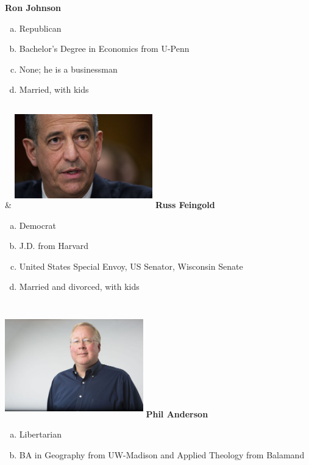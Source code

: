 \documentclass[twoside]{article}
\begin{document}
\begin{center}
\begin{tabu}
              \vskip0.5cm
              {\bfseries\Large Ron Johnson}
              \begin{enumerate}[a)]
                \item Republican
                \item Bachelor's Degree in Economics from U-Penn
                \item None; he is a businessman
                \item Married, with kids
              \end{enumerate}
              &
              \includegraphics[width=6cm,height=4.5cm,keepaspectratio]{images/profiles/feingold.jpeg}
              \vskip0.5cm
              {\bfseries\Large Russ Feingold}
              \begin{enumerate}[a)]
                \item Democrat
                \item J.D. from Harvard
                \item United States Special Envoy, US Senator, Wisconsin Senate
                \item Married and divorced, with kids
              \end{enumerate}\\
              \vskip2cm
              \includegraphics[width=6cm,height=4.5cm,keepaspectratio]{images/profiles/anderson.jpg}
              \vskip0.5cm
              {\bfseries\Large Phil Anderson}
              \begin{enumerate}[a)]
                \item Libertarian
                \item BA in Geography from UW-Madison and Applied Theology from Balamand

\end{enumerate}
\end{tabu}
\end{center}
\end{document}
